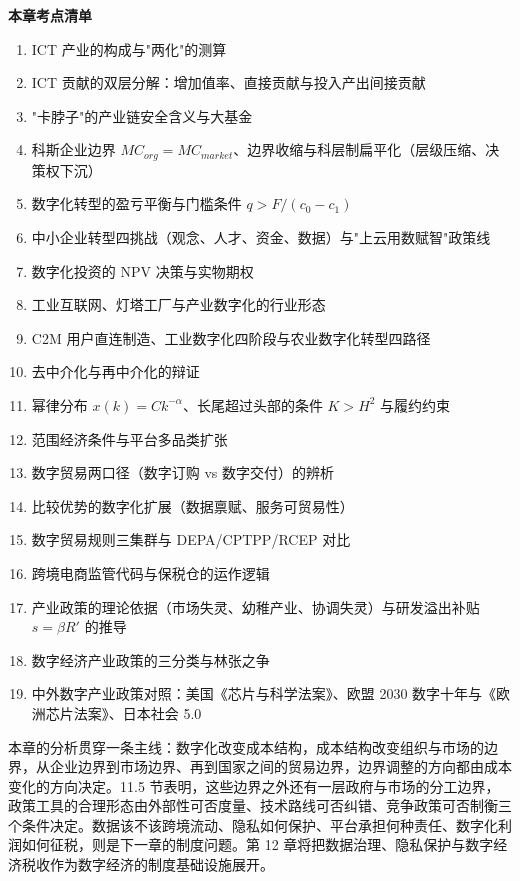 \begin{chapterbox}
\textbf{本章考点清单}

\begin{enumerate}
\item ICT 产业的构成与"两化"的测算 
\item ICT 贡献的双层分解：增加值率、直接贡献与投入产出间接贡献 
\item "卡脖子"的产业链安全含义与大基金 
\item 科斯企业边界 $MC_{org} = MC_{market}$、边界收缩与科层制扁平化（层级压缩、决策权下沉）
\item 数字化转型的盈亏平衡与门槛条件 $q > F/(c_0 - c_1)$ 
\item 中小企业转型四挑战（观念、人才、资金、数据）与"上云用数赋智"政策线 
\item 数字化投资的 NPV 决策与实物期权 
\item 工业互联网、灯塔工厂与产业数字化的行业形态 
\item C2M 用户直连制造、工业数字化四阶段与农业数字化转型四路径 
\item 去中介化与再中介化的辩证 
\item 幂律分布 $x(k) = Ck^{-\alpha}$、长尾超过头部的条件 $K > H^2$ 与履约约束 
\item 范围经济条件与平台多品类扩张 
\item 数字贸易两口径（数字订购 vs 数字交付）的辨析 
\item 比较优势的数字化扩展（数据禀赋、服务可贸易性）
\item 数字贸易规则三集群与 DEPA/CPTPP/RCEP 对比 
\item 跨境电商监管代码与保税仓的运作逻辑 
\item 产业政策的理论依据（市场失灵、幼稚产业、协调失灵）与研发溢出补贴 $s = \beta R'$ 的推导 
\item 数字经济产业政策的三分类与林张之争 
\item 中外数字产业政策对照：美国《芯片与科学法案》、欧盟 2030 数字十年与《欧洲芯片法案》、日本社会 5.0 
\end{enumerate}
\end{chapterbox}

本章的分析贯穿一条主线：数字化改变成本结构，成本结构改变组织与市场的边界，从企业边界到市场边界、再到国家之间的贸易边界，边界调整的方向都由成本变化的方向决定。11.5 节表明，这些边界之外还有一层政府与市场的分工边界，政策工具的合理形态由外部性可否度量、技术路线可否纠错、竞争政策可否制衡三个条件决定。数据该不该跨境流动、隐私如何保护、平台承担何种责任、数字化利润如何征税，则是下一章的制度问题。第 12 章将把数据治理、隐私保护与数字经济税收作为数字经济的制度基础设施展开。
